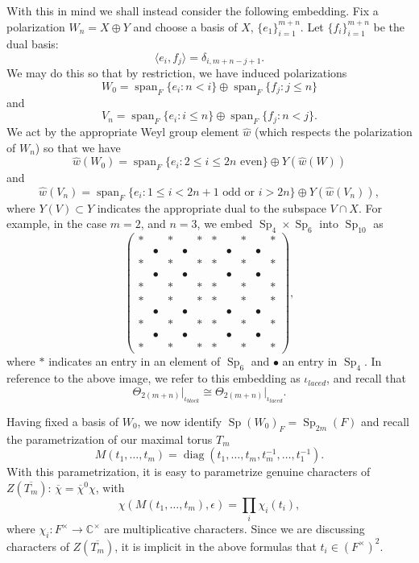 \documentclass[11pt,reqno]{amsart}
\theoremstyle{definition}
\theoremstyle{remark}
\theoremstyle{definition}
\begin{document}
With this in mind we shall instead consider the following embedding. Fix a polarization $W_n = X\oplus Y$ and choose a basis of $X$, $\{e_1\}_{i=1}^{m+n}$. Let $\{f_i\}_{i=1}^{m+n}$ be the dual basis:
\[
{\langle} e_i,f_j{\rangle} = \delta_{i, m+n-j+1}.
\]
We may do this so that by restriction, we have induced  polarizations $$W_0= \operatorname{span}_F\{e_i : n< i\}\oplus \operatorname{span}_F\{f_j : j\leq n\}$$ and $$V_n = \operatorname{span}_F\{e_i : i\leq n\} \oplus\operatorname{span}_F\{ f_j: n< j\}.$$
We act by the appropriate Weyl group element $\hat{w}$ (which respects the polarization of $W_n$) so that we have
\[
\hat{w}(W_0) =  \operatorname{span}_F\{e_i : 2\leq i \leq 2n \mbox{  even}\}\oplus Y(\hat{w}(W))
\]
and
\[
\hat{w}(V_n) = \operatorname{span}_F\{e_i : 1\leq i < 2n+1 \mbox{  odd or } i> 2n\}\oplus Y(\hat{w}(V_n)),
\]
where $Y(V)\subset Y$ indicates the appropriate dual to the subspace $V\cap X$. For example, in the case $m=2$, and $n=3$, we embed $\operatorname{Sp}_4\times \operatorname{Sp}_6$ into $\operatorname{Sp}_{10}$ as
\[
\left(\begin{array}{cccccccccc}
				\ast&&\ast&&\ast&\ast&&\ast&&\ast\\
				&\bullet&&\bullet&&&\bullet&&\bullet&\\
				\ast&&\ast&&\ast&\ast&&\ast&&\ast\\
				&\bullet&&\bullet&&&\bullet&&\bullet&\\
				\ast&&\ast&&\ast&\ast&&\ast&&\ast\\
				\ast&&\ast&&\ast&\ast&&\ast&&\ast\\
				&\bullet&&\bullet&&&\bullet&&\bullet&\\
				\ast&&\ast&&\ast&\ast&&\ast&&\ast\\
				&\bullet&&\bullet&&&\bullet&&\bullet&\\
				\ast&&\ast&&\ast&\ast&&\ast&&\ast
				\end{array}\right),
\] 
where $\ast$ indicates an entry in an element of $\operatorname{Sp}_6$ and $\bullet$ an entry in $\operatorname{Sp}_4$. In reference to the above image, we refer to this embedding as $\iota_{laced}$, and recall that
\[
\Theta_{2(m+n)}\big|_{\iota_{block}} \cong \Theta_{2(m+n)}\big|_{\iota_{laced}}.
\]

Having fixed a basis of $W_0$, we now identify $\operatorname{Sp}(W_0)_F = \operatorname{Sp}_{2m}(F)$ and recall the parametrization of our maximal torus $T_m$
\[
M(t_1,\ldots , t_m) = \operatorname{diag}(t_1,\ldots,t_m,t_m^{-1},\ldots, t_1^{-1}).
\]
With this parametrization, it is easy to parametrize genuine characters of $Z(\overline{T_m})$: $\overline{\chi}=\overline{\chi}^0\chi$, with 
\[
\chi(M(t_1,\ldots , t_m) ,{\epsilon})=\prod_i\chi_i(t_i),
\]
where $\chi_i:F^\times\to{\mathbb C}^\times$ are multiplicative characters. Since we are discussing characters of  $Z(\overline{T_m})$, it is implicit in the above formulas that $t_i\in (F^\times)^2$.
\end{document}
